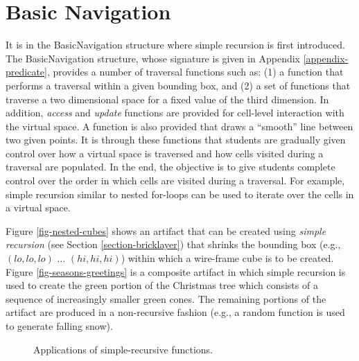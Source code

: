 \documentclass[submission,copyright,creativecommons]{eptcs}
\begin{document}
\section{Basic Navigation}\label{section-basic-navigation}
It is in the BasicNavigation structure where simple recursion is first introduced. The BasicNavigation structure, whose signature is given in Appendix \ref{appendix-predicate}, provides a number of traversal functions such as: (1) a function that performs a traversal within a given bounding box, and (2) a set of functions that traverse a two dimensional space for a fixed value of the third dimension. In addition, \emph{access} and \emph{update} functions are provided for cell-level interaction with the virtual space. A function is also provided that draws a ``smooth'' line between two given points. It is through these functions that students are gradually given control over how a virtual space is traversed and how cells visited during a traversal are populated. In the end, the objective is to give students complete control over the order in which cells are visited during a traversal. For example, simple recursion similar to nested for-loops can be used to iterate over the cells in a virtual space.

Figure \ref{fig-nested-cubes} shows an artifact that can be created using \emph{simple recursion} (see Section \ref{section-bricklayer}) that shrinks the bounding box (e.g., $(lo,lo,lo)$ $\dots$ $(hi,hi,hi)$) within which a wire-frame cube is to be created. Figure \ref{fig-seasons-greetings} is a composite artifact in which simple recursion is used to create the green portion of the Christmas tree which consists of a sequence of increasingly smaller green cones. The remaining portions of the artifact are produced in a non-recursive fashion (e.g., a random function is used to generate falling snow).


\begin{figure}[htb!]
\centering
{}
\caption{Applications of simple-recursive functions.}\label{fig-simple-recursive}
\end{figure}
\end{document}
